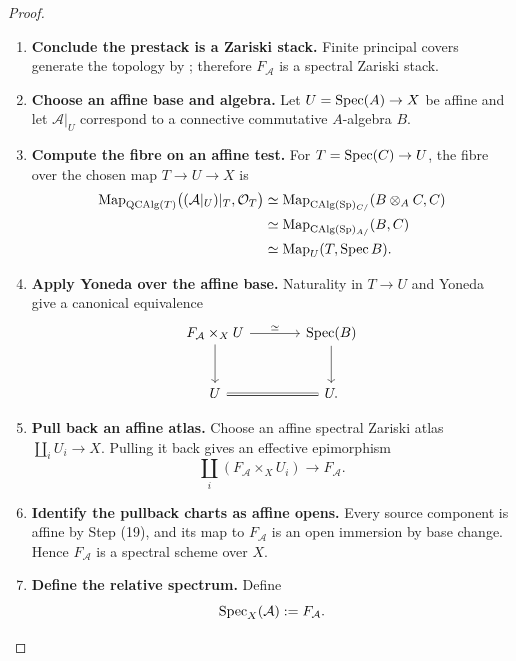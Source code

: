 \begin{proof}
\begin{enumerate}[label=\textup{(\arabic*)}]
    \item \textbf{Conclude the prestack is a Zariski stack.}
    Finite principal covers generate the topology by
    ; therefore
    \(F_{\mathcal A}\) is a spectral Zariski stack.

    \item \textbf{Choose an affine base and algebra.}
    Let \(U=\operatorname{Spec}(A)\to X\) be affine and let
    \(\mathcal A|_U\) correspond to a connective commutative
    \(A\)-algebra \(B\).

    \item \textbf{Compute the fibre on an affine test.}
    For \(T=\operatorname{Spec}(C)\to U\), the fibre over the
    chosen map \(T\to U\to X\) is
    \[
    \begin{aligned}
        \operatorname{Map}_{\operatorname{QCAlg}(T)}
        \bigl((\mathcal A|_U)|_T,\mathcal O_T\bigr)
        &\simeq
        \operatorname{Map}_{\operatorname{CAlg}(\operatorname{Sp})_{C/}}(B\otimes_AC,C)
        \\
        &\simeq
        \operatorname{Map}_{\operatorname{CAlg}(\operatorname{Sp})_{A/}}(B,C)
        \\
        &\simeq
        \operatorname{Map}_U(T,\operatorname{Spec} B).
    \end{aligned}
    \]

    \item \textbf{Apply Yoneda over the affine base.}
    Naturality in \(T\to U\) and Yoneda give a canonical equivalence
    \[
    \begin{tikzcd}[column sep=large, row sep=large]
        F_{\mathcal A}\times_XU
            \arrow[r, "\simeq"]
            \arrow[d]
        &
        \Spec(B)
            \arrow[d]
        \\
        U
            \arrow[r, equal]
        &
        U.
    \end{tikzcd}
    \]

    \item \textbf{Pull back an affine atlas.}
    Choose an affine spectral Zariski atlas
    \(\coprod_iU_i\to X\). Pulling it back gives an effective epimorphism
    \[
        \coprod_i(F_{\mathcal A}\times_XU_i)
        \longrightarrow
        F_{\mathcal A}.
    \]

    \item \textbf{Identify the pullback charts as affine opens.}
    Every source component is affine by Step \textup{(19)}, and its map to
    \(F_{\mathcal A}\) is an open immersion by base change. Hence
    \(F_{\mathcal A}\) is a spectral scheme over \(X\).

    \item \textbf{Define the relative spectrum.}
    Define
    \[
        \operatorname{Spec}_X(\mathcal A):=F_{\mathcal A}.
    \]


\end{enumerate}
\end{proof}
